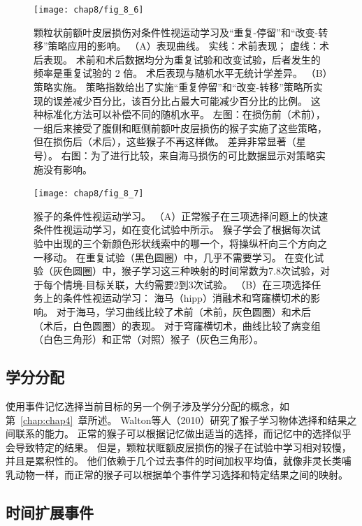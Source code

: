 \begin{figure} 
	\centering
	\texttt{[image: chap8/fig\_8\_6]}
	\caption{颗粒状前额叶皮层损伤对条件性视运动学习及“重复-停留”和“改变-转移”策略应用的影响。
		（A）表现曲线。
		实线：术前表现；
		虚线：术后表现。
		术前和术后数据均分为重复试验和改变试验，后者发生的频率是重复试验的 2 倍。
		术后表现与随机水平无统计学差异。
		（B）策略实施。
		策略指数给出了实施“重复停留”和“改变-转移”策略所实现的误差减少百分比，该百分比占最大可能减少百分比的比例。
		这种标准化方法可以补偿不同的随机水平。
		左图：在损伤前（术前），一组后来接受了腹侧和眶侧前额叶皮层损伤的猴子实施了这些策略，但在损伤后（术后），这些猴子不再这样做。
		差异非常显著（星号）。
		右图：为了进行比较，来自海马损伤的可比数据显示对策略实施没有影响\cite{bussey2001role}。 \label{fig:8_6}}
\end{figure}


\begin{figure} 
	\centering
	\texttt{[image: chap8/fig\_8\_7]}
	\caption{猴子的条件性视运动学习。
		（A）正常猴子在三项选择问题上的快速条件性视运动学习，如在变化试验中所示。
		猴子学会了根据每次试验中出现的三个新颜色形状线索中的哪一个，将操纵杆向三个方向之一移动。
		在重复试验（黑色圆圈）中，几乎不需要学习。
		在变化试验（灰色圆圈）中，猴子学习这三种映射的时间常数为7.8次试验，对于每个情境-目标关联，大约需要2到3次试验\cite{murray1996role}。
		（B）在三项选择任务上的条件性视运动学习：
		海马（hipp）消融术和穹窿横切术的影响。
		对于海马，学习曲线比较了术前（术前，灰色圆圈）和术后（术后，白色圆圈）的表现。
		对于穹窿横切术，曲线比较了病变组（白色三角形）和正常（对照）猴子（灰色三角形）\cite{brasted2005conditional}。\label{fig:8_7}}
\end{figure}


\subsection{学分分配}

使用事件记忆选择当前目标的另一个例子涉及学分分配的概念，如第~\ref{chap:chap4}~章所述。
Walton等人（2010）研究了猴子学习物体选择和结果之间联系的能力。
正常的猴子可以根据记忆做出适当的选择，而记忆中的选择似乎会导致特定的结果。
但是，颗粒状眶额皮层损伤的猴子在试验中学习相对较慢，并且是累积性的。
他们依赖于几个过去事件的时间加权平均值，就像非灵长类哺乳动物一样，而正常的猴子可以根据单个事件学习选择和特定结果之间的映射。



\subsection{时间扩展事件}

